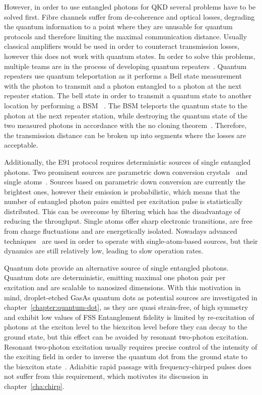However, in order to use entangled photons for \ac{QKD} several problems have to be solved first.
Fibre channels suffer from de-coherence and optical losses, degrading the quantum information to a point where they are unusable for quantum protocols and therefore limiting the maximal communication distance.
Usually classical amplifiers would be used in order to counteract transmission losses, however this does not work with quantum states.
In order to solve this problems, multiple teams are in the process of developing quantum repeaters~\cite{reindl_all-photonic_2018}\cite{duan_long-distance_2001}\cite{simon_quantum_2007}.
Quantum repeaters use quantum teleportation as it performs a Bell state measurement with the photon to transmit and a photon entangled to a photon at the next repeater station.
The bell state in order to transmit a quantum state to another location by performing a \ac{BSM} ~\cite{bennett_teleporting_1993}.
The \ac{BSM} teleports the quantum state to the photon at the next repeater station, while destroying the quantum state of the two measured photons in accordance with the no cloning theorem~\cite{park_concept_1970}.
Therefore, the transmission distance can be broken up into segments where the losses are acceptable.

Additionally, the E$91$ protocol requires deterministic sources of single entangled photons.
Two prominent sources are parametric down conversion crystals~\cite{shih_new_1988} and single atoms~\cite{aspect_experimental_1981}.
Sources based on parametric down conversion are currently the brightest ones, however their emission is probabilistic, which means that the number of entangled photon pairs emitted per excitation pulse is statistically distributed.
This can be overcome by filtering which has the disadvantage of reducing the throughput.
Single atoms offer sharp electronic transitions, are free from charge fluctuations and are energetically isolated.
Nowadays advanced techniques~\cite{kuhn_deterministic_2002} are used in order to operate with single-atom-based sources, but their dynamics are still relatively low, leading to slow operation rates.

Quantum dots provide an alternative source of single entangled photons.
Quantum dots are deterministic, emitting maximal one photon pair per excitation and are scalable to nanosized dimensions.
With this motivation in mind, droplet-etched GasAs quantum dots as potential sources are investigated in chapter~\ref{chapter:quantum-dot}, as they are quasi strain-free, of high symmetry and exhibit low values of \ac{FSS}
Entanglement fidelity is limited by re-excitation of photons at the exciton level to the biexciton level before they can decay to the ground state, but this effect can be avoided by resonant two-photon excitation.
Resonant two-photon excitation usually requires precise control of the intensity of the exciting field in order to inverse the quantum dot from the ground state to the biexciton state~\cite{jayakumar_deterministic_2013}.
Adiabitic rapid passage with frequency-chirped pulses does not suffer from this requirement, which motivates its discussion in chapter~\ref{cha:chirp}.

